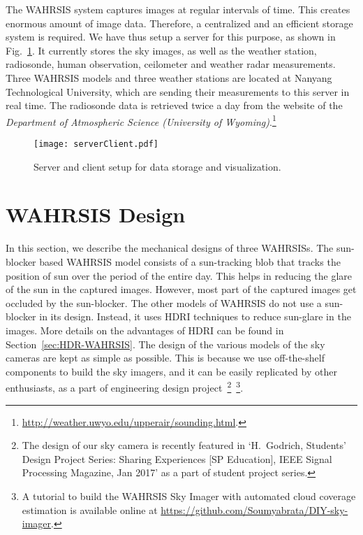 The WAHRSIS system captures images at regular intervals of time. This creates enormous amount of image data. Therefore, a centralized and an efficient storage system is required. We have thus setup a server for this purpose, as shown in Fig.~\ref{fig:serverclient}. It currently stores the sky images, as well as the weather station, radiosonde, human observation, ceilometer and weather radar measurements. Three WAHRSIS models and three weather stations are located at Nanyang Technological University, which are sending their measurements to this server in real time. The radiosonde data is retrieved twice a day from the website of the \emph{Department of Atmospheric Science (University of Wyoming)}.\footnote{\url{http://weather.uwyo.edu/upperair/sounding.html}.} 

\begin{figure}[htb]
\begin{center}
\texttt{[image: serverClient.pdf]}
\caption[Server-client setup in WAHRSIS.]{Server and client setup for data storage and visualization.\label{fig:serverclient}}
\end{center}
\end{figure}

\section{WAHRSIS Design} 
\label{sec:WSI-design}
In this section, we describe the mechanical designs of three WAHRSISs. The sun-blocker based WAHRSIS model consists of a sun-tracking blob that tracks the position of sun over the period of the entire day. This helps in reducing the glare of the sun in the captured images. However, most part of the captured images get occluded by the sun-blocker. The other models of WAHRSIS do not use a sun-blocker in its design. Instead, it uses HDRI techniques to reduce sun-glare in the images. More details on the advantages of HDRI can be found in Section~\ref{sec:HDR-WAHRSIS}. The design of the various models of the sky cameras are kept as simple as possible. This is because we use off-the-shelf components to build the sky imagers, and it can be easily replicated by other enthusiasts, as a part of engineering design project~\footnote{The design of our sky camera is recently featured in `H.\ Godrich, Students' Design Project Series: Sharing Experiences [SP Education], IEEE Signal Processing Magazine, Jan 2017' as a part of student project series.}~\footnote{A tutorial to build the WAHRSIS Sky Imager with automated cloud coverage estimation is available online at \url{https://github.com/Soumyabrata/DIY-sky-imager}.}.

